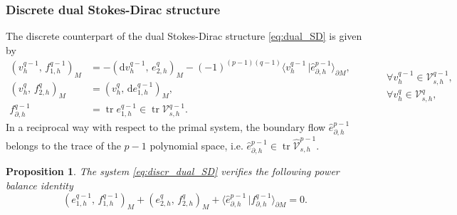 \documentclass{elsarticle}
\newtheorem{proposition}{Proposition}
\renewcommand\d{\ensuremath{\mathrm{d}}}
\DeclareMathOperator{\tr}{tr}
\newcommand*{\dual}[1]{\ensuremath{\widehat{#1}}}
\newcommand{\inpr}[3][]{\ensuremath{( #2, \, #3 )_{#1}}}
\newcommand{\dualpr}[3][]{\ensuremath{\langle #2 \, \vert #3 \rangle_{#1}}}
\begin{document}
{\subsubsection{Discrete dual Stokes-Dirac structure}
The discrete counterpart of the dual Stokes-Dirac structure \eqref{eq:dual_SD} is given by
\begin{equation}\label{eq:discr_dual_SD}
    \begin{aligned}
    \inpr[M]{{v}^{q-1}_h}{{f}^{q-1}_{1, h}} &= -\inpr[M]{\d{v}^{q-1}_h}{{e}_{2, h}^q} - (-1)^{(p-1)(q-1)} \dualpr[\partial M]{{v}^{q-1}_h}{\dual{e}_{\partial, h}^{p-1}}, \\
    \inpr[M]{v^q_h}{f^q_{2, h}} &= \inpr[M]{v^q_h}{\d e^{q-1}_{1, h}}, \\
    f_{\partial, h}^{q-1} &= \tr e_{1, h}^{q-1} \in \tr \mathcal{V}_{s, h}^{q-1}.
    \end{aligned} \qquad
    \begin{aligned}
    &\forall {v}^{q-1}_h \in \mathcal{V}_{s, h}^{q-1}, \\
    &\forall v^q_h \in \mathcal{V}_{s, h}^{q}, \\
    &
    \end{aligned}
\end{equation}
In a reciprocal way with respect to the primal system, the boundary flow $\dual{e}_{\partial, h}^{p-1}$ belongs to the trace of the $p-1$ polynomial space, i.e. $\dual{e}_{\partial, h}^{p-1} \in \tr \mathcal{\dual{V}}_{s, h}^{p-1}$.
\begin{proposition}\label{pr:discr_innerpowbal_dual}
The  system \eqref{eq:discr_dual_SD} verifies the following power balance identity 
\begin{equation}\label{eq:discr_powbal_dual}
\inpr[M]{{e}^{q-1}_{1, h}}{f^{q-1}_{1, h}} + \inpr[M]{e^{q}_{2, h}}{{f}^q_{2, h}} + \dualpr[\partial M]{\dual{e}^{p-1}_{\partial, h}}{f_{\partial, h}^{q-1}} = 0. 
\end{equation}
\end{proposition}

}
\end{document}
